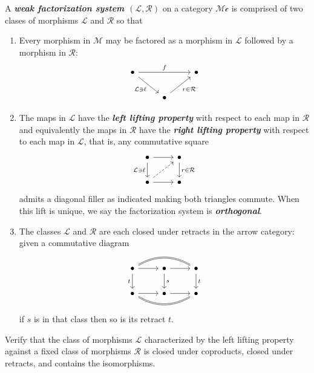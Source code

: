 \begin{defn}
	A \textbf{\textit{weak factorization system $(\mathcal{L},\mathcal{R})$}} on a category $\mathcal{Mc}$ is comprised of two clases of morphisms $\mathcal{L}$ and $\mathcal{R}$ so that
	\begin{enumerate}
		\item Every morphism in $\mathcal{M}$ may be factored as a morphism in $\mathcal{L}$ followed by a morphism in $\mathcal{R}$:
		\[\begin{tikzcd}
			\bullet\arrow[rr,"f"]\arrow[rd,"\mathcal{L}\ni\ell",swap]&&\bullet\\
			&\bullet\arrow[ru,"r\in \mathcal{R}",swap]
		\end{tikzcd}\]
		\item The maps in $\mathcal{L}$ have the \textbf{\textit{left lifting property}} with respect to each map in $\mathcal{R}$ and equivalently the maps in $\mathcal{R}$ have the \textbf{\textit{right lifting property}} with respect to each map in $\mathcal{L}$, that is, any commutative square
		\[\begin{tikzcd}
			\bullet\arrow[d,"\mathcal{L}\ni\ell",swap]\arrow[r]&\bullet\arrow[d,"r\in\mathcal{R}"]\\
			\bullet\arrow[ur,dashed]\arrow[r]&\bullet
		\end{tikzcd}\]
		admits a diagonal filler as indicated making both triangles commute. When this lift is unique, we say the factorization system is \textbf{\textit{orthogonal}}.
		\item The classes $\mathcal{L}$ and $\mathcal{R}$ are each closed under retracts in the arrow category: given a commutative diagram
		\[\begin{tikzcd}
			\bullet\arrow[r]\arrow[d,"t",swap]\arrow[rr,bend left,no head,shift left=.3]\arrow[rr,bend left,no head,shift right=.3]&\bullet\arrow[r]\arrow[d,"s"]&\bullet\arrow[d,"t"]\\
			\bullet\arrow[r]\arrow[rr,bend right,no head, shift right=.3]\arrow[rr,bend right,no head, shift left=.3]&\bullet\arrow[r]&\bullet
		\end{tikzcd}\]
		if $s$ is in that class then so is its retract $t$.
	\end{enumerate}
\end{defn}

\begin{exercise}[3.1.8, Rihel]
Verify that the class of morphisms $\mathcal{L}$ characterized by the left lifting property against a fixed class of morphisms $\mathcal{R}$ is closed under coproducts, closed under retracts, and contains the isomorphisms.
\end{exercise}

